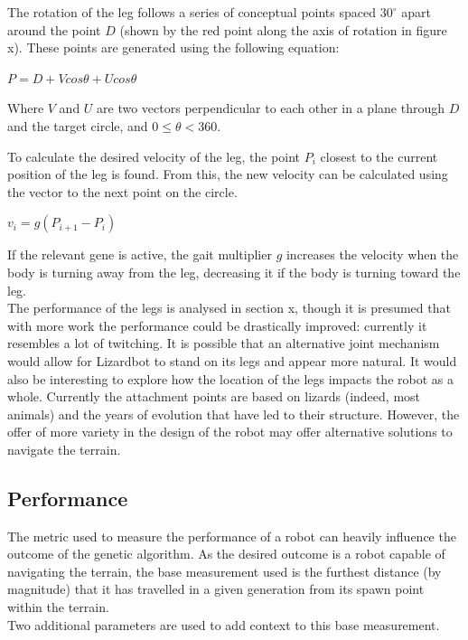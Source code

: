 \documentclass{article}
\begin{document}
The rotation of the leg follows a series of conceptual points spaced $30^\circ$ apart around the point $D$ (shown by the red point along the axis of rotation in figure x). These points are generated using the following equation:
\begin{center}
\begin{Large}
$P = D + Vcos\theta + Ucos\theta$\\
\end{Large}
\end{center}
Where $V$ and $U$ are two vectors perpendicular to each other in a plane through $D$ and the target circle, and $0\leq\theta<360$. 
 
To calculate the desired velocity of the leg, the point $P_i$ closest to the current position of the leg is found. From this, the new velocity can be calculated using the vector to the next point on the circle.   
\begin{center}
\begin{Large}
$v_{i} = g(P_{i + 1} - P_{i})$
\end{Large}
\end{center}
If the relevant gene is active, the gait multiplier $g$ increases the velocity when the body is turning away from the leg, decreasing it if the body is turning toward the leg.\\

The performance of the legs is analysed in section x, though it is presumed that with more work the performance could be drastically improved: currently it resembles a lot of twitching. It is possible that an alternative joint mechanism would allow for Lizardbot to stand on its legs and appear more natural. It would also be interesting to explore how the location of the legs impacts the robot as a whole. Currently the attachment points are based on lizards (indeed, most animals) and the years of evolution that have led to their structure. However, the offer of more variety in the design of the robot may offer alternative solutions to navigate the terrain. 


\subsection{Performance}
The metric used to measure the performance of a robot can heavily influence the outcome of the genetic algorithm. As the desired outcome is a robot capable of navigating the terrain, the base measurement used is the furthest distance (by magnitude) that it has travelled in a given generation from its spawn point within the terrain. 
\\[1\baselineskip]
Two additional parameters are used to add context to this base measurement. 
\end{document}
